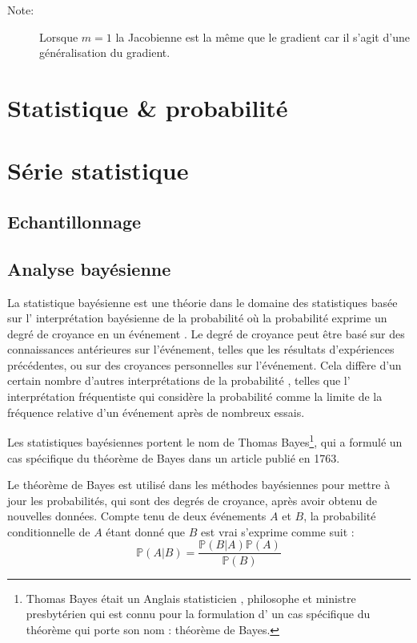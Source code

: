 	
	
		
		
	\begin{description}
		\item[Note:] Lorsque $m=1$ la Jacobienne est la même que le gradient car il s'agit d'une généralisation du gradient.
	\end{description}
	
		
		
		
	\section{Statistique \& probabilité}
	\section{Série statistique}
		\lipsum[1]
	\subsection{Echantillonnage}
		\lipsum[1]
		
	\subsection{Analyse bayésienne}
		La statistique bayésienne est une théorie dans le domaine des statistiques basée sur l' interprétation bayésienne de la probabilité où la probabilité exprime un degré de croyance en un événement . Le degré de croyance peut être basé sur des connaissances antérieures sur l'événement, telles que les résultats d'expériences précédentes, ou sur des croyances personnelles sur l'événement. Cela diffère d'un certain nombre d'autres interprétations de la probabilité , telles que l' interprétation fréquentiste qui considère la probabilité comme la limite de la fréquence relative d'un événement après de nombreux essais.
		
		Les statistiques bayésiennes portent le nom de Thomas Bayes\footnote{Thomas Bayes était un Anglais statisticien , philosophe et ministre presbytérien qui est connu pour la formulation d' un cas spécifique du théorème qui porte son nom : théorème de Bayes.}, qui a formulé un cas spécifique du théorème de Bayes dans un article publié en 1763.
		
		
		
		\begin{thm} Le théorème de Bayes est utilisé dans les méthodes bayésiennes pour mettre à jour les probabilités, qui sont des degrés de croyance, après avoir obtenu de nouvelles données. Compte tenu de deux événements $A$  et $B$, la probabilité conditionnelle de $A$ étant donné que $B$ est vrai s'exprime comme suit  :
			\begin{equation}
				\mathbb{P}(A|B) = \frac{\mathbb{P}(B|A) \mathbb{P}(A)}{\mathbb{P}(B)}
			\end{equation}
			
		\end{thm}
	
